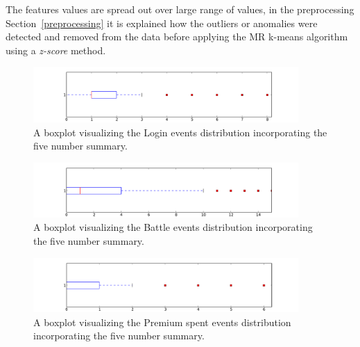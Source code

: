 The features values are spread out over large range of values, in the preprocessing Section~\ref{preprocessing} it is explained how the outliers or anomalies were detected and removed from the data before applying the MR k-means algorithm using a \textit{z-score} method.

\begin{center}
\begin{figure}[h]
\centerline{\includegraphics[width=0.9\textwidth]{Figures/boxplot_logins.pdf}}
\caption{A boxplot visualizing the Login events distribution incorporating the five number summary.}
\label{fig:boxplot_logins}
\end{figure}

\begin{figure}[h]
\centerline{\includegraphics[width=0.9\textwidth]{Figures/boxplot_battles.pdf}}
\caption{A boxplot visualizing the Battle events distribution incorporating the five number summary.}
\label{fig:boxplot_battles}
\end{figure}

\begin{figure}[here]
\centerline{\includegraphics[width=0.9\textwidth]{Figures/boxplot_premiumspent.pdf}}
\caption{A boxplot visualizing the Premium spent events distribution incorporating the five number summary.}
\label{fig:boxplot_premium}
\end{figure}
\end{center}


